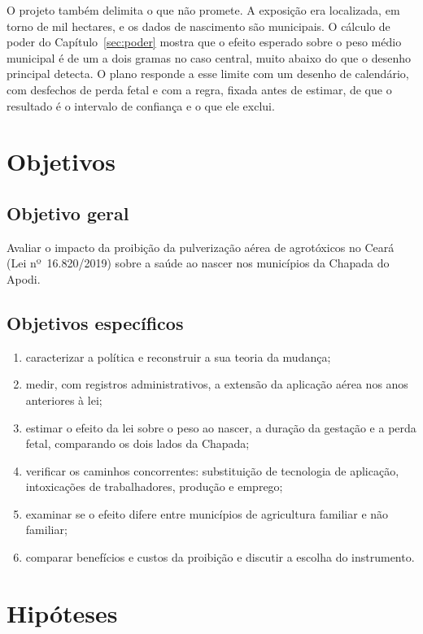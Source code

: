 O projeto também delimita o que não promete. A exposição era localizada, em
torno de mil hectares, e os dados de nascimento são municipais. O cálculo de
poder do Capítulo~\ref{sec:poder} mostra que o efeito esperado sobre o peso
médio municipal é de um a dois gramas no caso central, muito abaixo do que o
desenho principal detecta. O plano responde a esse limite com um desenho de
calendário, com desfechos de perda fetal e com a regra, fixada antes de
estimar, de que o resultado é o intervalo de confiança e o que ele exclui.

\section{Objetivos}

\subsection{Objetivo geral}

Avaliar o impacto da proibição da pulverização aérea de agrotóxicos no Ceará
(Lei nº~16.820/2019) sobre a saúde ao nascer nos municípios da Chapada do
Apodi.

\subsection{Objetivos específicos}

\begin{enumerate}[label=\alph*)]
\item caracterizar a política e reconstruir a sua teoria da mudança;
\item medir, com registros administrativos, a extensão da aplicação aérea nos
anos anteriores à lei;
\item estimar o efeito da lei sobre o peso ao nascer, a duração da gestação e a
perda fetal, comparando os dois lados da Chapada;
\item verificar os caminhos concorrentes: substituição de tecnologia de
aplicação, intoxicações de trabalhadores, produção e emprego;
\item examinar se o efeito difere entre municípios de agricultura familiar e não
familiar;
\item comparar benefícios e custos da proibição e discutir a escolha do
instrumento.
\end{enumerate}

\section{Hipóteses}

